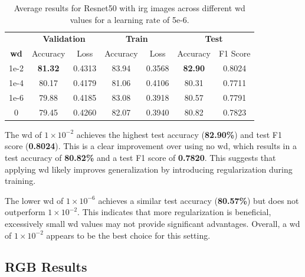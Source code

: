 \begin{table}[h]
    \centering
    \renewcommand{\arraystretch}{1.3}
    \setlength{\tabcolsep}{8pt}
    \begin{tabular}{|c|cccccc|}
        \hline
        & \multicolumn{2}{c}{\textbf{Validation}} & \multicolumn{2}{c}{\textbf{Train}} & \multicolumn{2}{c|}{\textbf{Test}} \\
        \textbf{\gls{wd}} & Accuracy & Loss & Accuracy & Loss & Accuracy & F1 Score \\
        \hline
        1e-2 & \textbf{81.32} & 0.4313 & 83.94 & 0.3568 & \textbf{82.90} & 0.8024 \\
        1e-4 & 80.17 & 0.4179 & 81.06 & 0.4106 & 80.31 & 0.7711 \\
        1e-6 & 79.88 & 0.4185 & 83.08 & 0.3918 & 80.57 & 0.7791 \\
        0    & 79.45 & 0.4260 & 82.07 & 0.3940 & 80.82 & 0.7823 \\
        \hline
    \end{tabular}
    \caption{Average results for Resnet50 with \gls{irg} images across different \gls{wd} values for a learning rate of 5e-6.}
    \label{tab:resnet50_wd_irg}
\end{table}

The \gls{wd} of $1\times10^{-2}$ 
achieves the highest test accuracy (\textbf{82.90\%}) and test F1 score 
(\textbf{0.8024}). This is a clear improvement over using no \gls{wd}, 
which results in a test accuracy of \textbf{80.82\%} and a test F1 score 
of \textbf{0.7820}. This suggests that applying \gls{wd} likely 
improves generalization by introducing regularization during training.

The lower \gls{wd} of $1\times10^{-6}$ achieves a similar test accuracy (\textbf{80.57\%}) 
but does not outperform $1\times10^{-2}$. This indicates that more regularization is beneficial, excessively small 
\gls{wd} values may not provide significant advantages. Overall, a \gls{wd} of $1\times10^{-2}$ appears to be 
the best choice for this setting.



\subsection{RGB Results}

